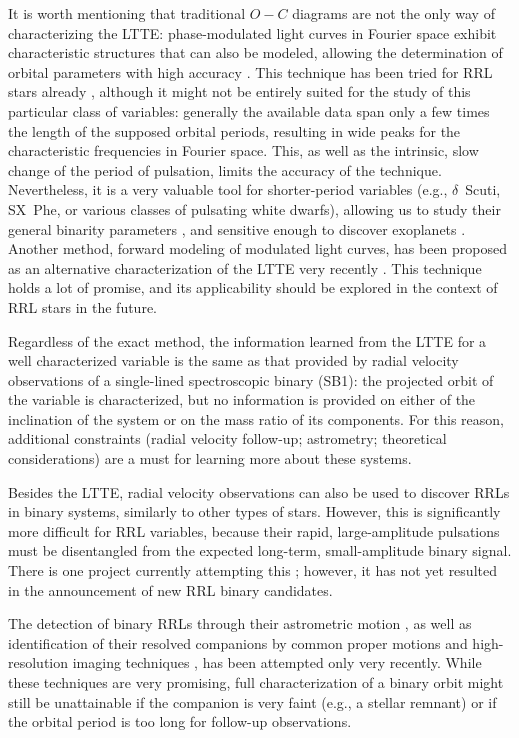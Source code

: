 \documentclass[twocolumn,times]{aastex63}
\begin{document}
It is worth mentioning that traditional $O-C$ diagrams are not the only way of characterizing the LTTE:
phase-modulated light curves in Fourier space exhibit characteristic structures that
can also be modeled, allowing the determination of orbital parameters with high accuracy \citep{2012MNRAS.422..738S,2015MNRAS.450.3999S}.
This technique has been tried for RRL stars already \citep{2017EPJWC.15203006S}, although it
might not be entirely suited for the study of this particular class of variables: generally the available data span only a few times the
length of the supposed orbital periods, resulting in wide peaks for the characteristic frequencies in Fourier space.
This, as well as the intrinsic, slow change of the period of pulsation, limits the accuracy of the technique.
Nevertheless, it is a very valuable tool for
shorter-period variables (e.g., $\delta$~Scuti, SX~Phe, or various classes of pulsating white dwarfs),
allowing us to study their general binarity parameters \citep{2018MNRAS.474.4322M}, and sensitive enough to
discover exoplanets \citep{2016ApJ...827L..17M}.
Another method, forward modeling of modulated light curves, has been proposed as an alternative characterization of the LTTE
very recently \citep{2020AJ....159..202H}. This technique holds a lot of promise, and its applicability should be explored
in the context of RRL stars in the future. 

Regardless of the exact method, the information learned from the LTTE for a well characterized
variable is the same as that provided by radial velocity observations of a single-lined spectroscopic binary (SB1):
the projected orbit of the variable is characterized, but no information is provided on either
of the inclination of the system or on the mass ratio of its components. For this reason, additional
constraints (radial velocity follow-up; astrometry; theoretical considerations) are a must for
learning more about these systems.

Besides the LTTE, radial velocity observations can also be used to discover RRLs in binary systems, similarly
to other types of stars. However, this is significantly more difficult for RRL variables, because their
rapid, large-amplitude pulsations must be disentangled from the expected long-term, small-amplitude binary signal.
There is one project currently attempting this \citep{2016CoKon.105..145G}; however, it has not yet resulted
in the announcement of new RRL binary candidates.

The detection of binary RRLs through their astrometric motion
\citep{2019A&A...623A.116K}, as well as identification of their resolved companions by common proper
motions \citep{2019A&A...623A.117K} and high-resolution imaging techniques \citep{2020RNAAS...4..143S},
has been attempted only very recently. While these techniques are very promising, full characterization
of a binary orbit might still be unattainable if the companion is very faint (e.g., a stellar remnant)
or if the orbital period is too long for follow-up observations.
\end{document}
